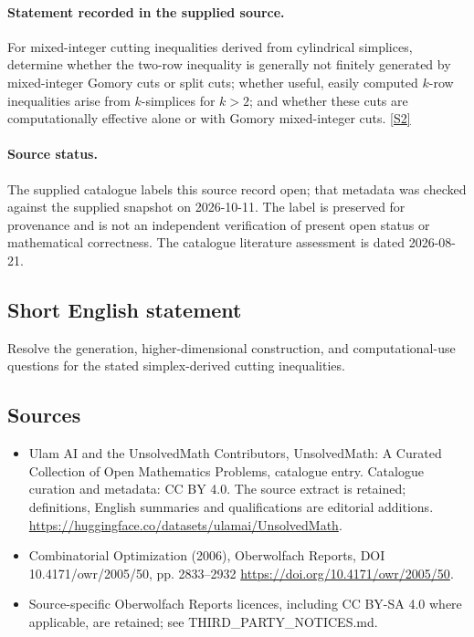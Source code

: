 \documentclass[11pt]{article}
\begin{document}
\paragraph{Statement recorded in the supplied source.}
For mixed-integer cutting inequalities derived from cylindrical simplices, determine whether the two-row inequality is generally not finitely generated by mixed-integer Gomory cuts or split cuts; whether useful, easily computed $k$-row inequalities arise from $k$-simplices for $k>2$; and whether these cuts are computationally effective alone or with Gomory mixed-integer cuts. \href{https://doi.org/10.4171/owr/2005/50}{[S2]}
\paragraph{Source status.}
The supplied catalogue labels this source record open; that metadata was checked against the supplied snapshot on 2026-10-11. The label is preserved for provenance and is not an independent verification of present open status or mathematical correctness. The catalogue literature assessment is dated 2026-08-21.
\subsection{Short English statement}
Resolve the generation, higher-dimensional construction, and computational-use questions for the stated simplex-derived cutting inequalities.
\subsection{Sources}
\begin{itemize}
\item[S1] Ulam AI and the UnsolvedMath Contributors, UnsolvedMath: A Curated Collection of Open Mathematics Problems, catalogue entry. Catalogue curation and metadata: CC BY 4.0. The source extract is retained; definitions, English summaries and qualifications are editorial additions.
\url{https://huggingface.co/datasets/ulamai/UnsolvedMath}.
\item[S2] Combinatorial Optimization (2006), Oberwolfach Reports, DOI 10.4171/owr/2005/50, pp. 2833--2932
\url{https://doi.org/10.4171/owr/2005/50}.
\item Source-specific Oberwolfach Reports licences, including CC BY-SA 4.0 where applicable, are retained; see THIRD\_PARTY\_NOTICES.md.
\end{itemize}
\end{document}
